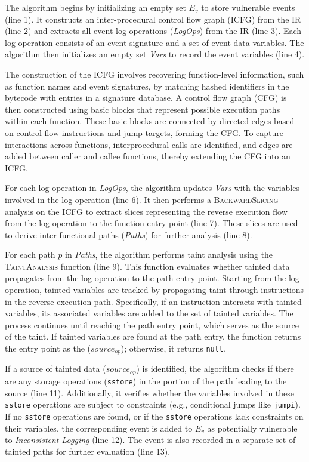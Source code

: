 The algorithm begins by initializing an empty set \(E_v\) to store vulnerable events (line 1). It constructs an inter-procedural control flow graph (ICFG) from the IR (line 2) and extracts all event log operations (\textit{LogOps}) from the IR (line 3). Each log operation consists of an event signature and a set of event data variables. The algorithm then initializes an empty set \textit{Vars} to record the event variables (line 4).

The construction of the ICFG involves recovering function-level information, such as function names and event signatures, by matching hashed identifiers in the bytecode with entries in a signature database. A control flow graph (CFG) is then constructed using basic blocks that represent possible execution paths within each function. These basic blocks are connected by directed edges based on control flow instructions and jump targets, forming the CFG. To capture interactions across functions, interprocedural calls are identified, and edges are added between caller and callee functions, thereby extending the CFG into an ICFG. 

For each log operation in \textit{LogOps}, the algorithm updates \textit{Vars} with the variables involved in the log operation (line 6). It then performs a \textsc{BackwardSlicing} analysis on the ICFG to extract slices representing the reverse execution flow from the log operation to the function entry point (line 7). These slices are used to derive inter-functional paths (\textit{Paths}) for further analysis (line 8).

For each path \(p\) in \textit{Paths}, the algorithm performs taint analysis using the \textsc{TaintAnalysis} function (line 9). This function evaluates whether tainted data propagates from the log operation to the path entry point. Starting from the log operation, tainted variables are tracked by propagating taint through instructions in the reverse execution path. Specifically, if an instruction interacts with tainted variables, its associated variables are added to the set of tainted variables. The process continues until reaching the path entry point, which serves as the source of the taint. If tainted variables are found at the path entry, the function returns the entry point as the (\(source_{op}\)); otherwise, it returns \texttt{null}.

If a source of tainted data (\(source_{op}\)) is identified, the algorithm checks if there are any storage operations (\texttt{sstore}) in the portion of the path leading to the source (line 11). Additionally, it verifies whether the variables involved in these \texttt{sstore} operations are subject to constraints (e.g., conditional jumps like \texttt{jumpi}). If no \texttt{sstore} operations are found, or if the \texttt{sstore} operations lack constraints on their variables, the corresponding event is added to \(E_v\) as potentially vulnerable to \emph{Inconsistent Logging} (line 12). The event is also recorded in a separate set of tainted paths for further evaluation (line 13).

